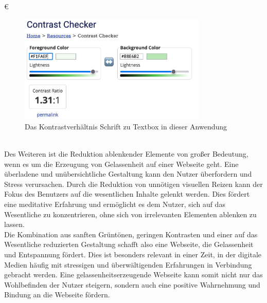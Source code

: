 €\documentclass[./dokumentation.tex]{subfiles}
\begin{document}
\begin{figure}[H]
    \centering
    \includegraphics[width=0.8\textwidth]{bilder/contrast-box.png}
    \caption{Das Kontrastverhältnis Schrift zu Textbox in dieser Anwendung}
    \label{fig23:contrast}
\end{figure}\\

Des Weiteren ist die Reduktion ablenkender Elemente von großer Bedeutung, wenn es um die Erzeugung von Gelassenheit auf einer Webseite geht. Eine überladene und unübersichtliche Gestaltung kann den Nutzer überfordern und Stress verursachen. Durch die Reduktion von unnötigen visuellen Reizen kann der Fokus des Benutzers auf die wesentlichen Inhalte gelenkt werden. Dies fördert eine meditative Erfahrung und ermöglicht es dem Nutzer, sich auf das Wesentliche zu konzentrieren, ohne sich von irrelevanten Elementen ablenken zu lassen.\\

Die Kombination aus sanften Grüntönen, geringen Kontrasten und einer auf das Wesentliche reduzierten Gestaltung schafft also eine Webseite, die Gelassenheit und Entspannung fördert. Dies ist besonders relevant in einer Zeit, in der digitale Medien häufig mit stressigen und überwältigenden Erfahrungen in Verbindung gebracht werden. Eine gelassenheitserzeugende Webseite kann somit nicht nur das Wohlbefinden der Nutzer steigern, sondern auch eine positive Wahrnehmung und Bindung an die Webseite fördern.\\

\end{document}
